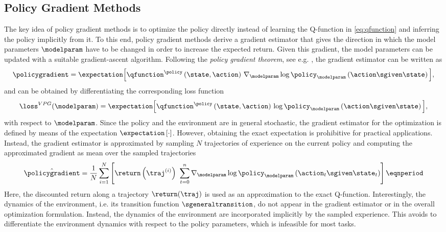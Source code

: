 \subsection{Policy Gradient Methods}
\label{sec:vpg}


The key idea of policy gradient methods is to optimize the policy directly instead of learning the Q-function in \eqref{eq:qfunction} and inferring the policy implicitly from it.
To this end, policy gradient methods derive a gradient estimator that gives the direction in which the model parameters $\modelparam$ have to be changed in order to increase the expected return.
Given this gradient, the model parameters can be updated with a suitable gradient-ascent algorithm.
Following the \textit{policy gradient theorem}, see e.g. \cite{sutton2018reinforcement}, the gradient estimator can be written as
\begin{equation}
  \policygradient = \expectation\Big[\qfunction^{\policy}\left(\state,\action\right) \,\nabla_{\modelparam}\log \policy_{\modelparam}\left(\action\sgiven\state \right) \Big],
  \label{eq:pg_gradient}
\end{equation}
and can be obtained by differentiating the corresponding loss function
\begin{equation}
  \loss^{VPG}(\modelparam) = \expectation\Big[ \qfunction^{\policy}\left(\state,\action\right) \,  \log \policy_{\modelparam}\left(\action\sgiven\state \right)\Big],
  \label{eq:pg_loss}
\end{equation}
with respect to $\modelparam$.
Since the policy and the environment are in general stochastic, the gradient estimator for the optimization is defined by means of the expectation $\expectation\left[\cdot\right]$.
However, obtaining the exact expectation is prohibitive for practical applications.
Instead, the gradient estimator is approximated by sampling $N$ trajectories of experience on the current policy and computing the approximated gradient as mean over the sampled trajectories
\begin{equation}
  \hat{\policygradient} = \frac{1}{N}\sum_{i=1}^N\left[\return\left(\traj^{(i)}\right) \ \sum_{t=0}^n  \nabla_{\modelparam}\log \policy_{\modelparam}\left(\action_t\sgiven\state_t \right)\right] \eqnperiod
  \label{eq:pg_approx_gradient}
\end{equation}
Here, the discounted return along a trajectory $\return(\traj)$ is used as an approximation to the exact Q-function.
Interestingly, the dynamics of the environment, i.e. its transition function $\sgeneraltransition$, do not appear in the gradient estimator or in the overall optimization formulation.
Instead, the dynamics of the environment are incorporated implicitly by the sampled experience.
This avoids to differentiate the environment dynamics with respect to the policy parameters, which is infeasible for most tasks.

